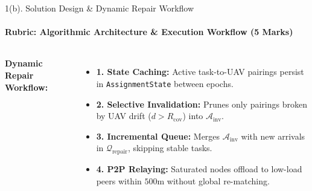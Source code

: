 \documentclass[aspectratio=169, 11pt]{beamer}
\begin{document}
\begin{frame}{1(b). Solution Design \& Dynamic Repair Workflow}
    \framesubtitle{Rubric: Algorithmic Architecture \& Execution Workflow (5 Marks)}
    \begin{columns}[T]
        \textbf{Dynamic Repair Workflow:}
        \begin{itemize}\setlength{\itemsep}{5pt}\footnotesize
            \item \textbf{1. State Caching:}
            Active task-to-UAV pairings persist in \texttt{AssignmentState} between epochs.
            \item \textbf{2. Selective Invalidation:}
            Prunes only pairings broken by UAV drift ($d > R_{\text{cov}}$) into $\mathcal{A}_{\text{inv}}$.
            \item \textbf{3. Incremental Queue:}
            Merges $\mathcal{A}_{\text{inv}}$ with new arrivals in $\mathcal{Q}_{\text{repair}}$, skipping stable tasks.
            \item \textbf{4. P2P Relaying:}
            Saturated nodes offload to low-load peers within $500$m without global re-matching.
        \end{itemize}


\end{columns}
\end{frame}
\end{document}
